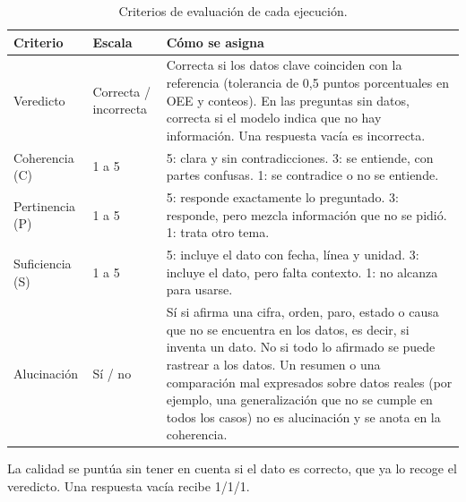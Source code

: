 \begin{singlespace}
\begin{table}[H]
\centering\small\renewcommand{\arraystretch}{1.25}
\caption{Criterios de evaluación de cada ejecución.}\label{tab:criterios_anexo}
\begin{tabular}{@{}p{2.6cm}p{2.4cm}p{9.2cm}@{}}
\toprule
\rowcolor{tblhead}\textbf{Criterio} & \textbf{Escala} & \textbf{Cómo se asigna}\\
\midrule
Veredicto & Correcta / incorrecta & Correcta si los datos clave coinciden con la referencia (tolerancia de 0,5 puntos porcentuales en OEE y conteos). En las preguntas sin datos, correcta si el modelo indica que no hay información. Una respuesta vacía es incorrecta.\\
\rowcolor{tblzebra}Coherencia (C) & 1 a 5 & 5: clara y sin contradicciones. 3: se entiende, con partes confusas. 1: se contradice o no se entiende.\\
Pertinencia (P) & 1 a 5 & 5: responde exactamente lo preguntado. 3: responde, pero mezcla información que no se pidió. 1: trata otro tema.\\
\rowcolor{tblzebra}Suficiencia (S) & 1 a 5 & 5: incluye el dato con fecha, línea y unidad. 3: incluye el dato, pero falta contexto. 1: no alcanza para usarse.\\
Alucinación & Sí / no & Sí si afirma una cifra, orden, paro, estado o causa que no se encuentra en los datos, es decir, si inventa un dato. No si todo lo afirmado se puede rastrear a los datos. Un resumen o una comparación mal expresados sobre datos reales (por ejemplo, una generalización que no se cumple en todos los casos) no es alucinación y se anota en la coherencia.\\
\bottomrule
\end{tabular}
\end{table}
La calidad se puntúa sin tener en cuenta si el dato es correcto, que ya lo recoge el veredicto. Una respuesta vacía recibe 1/1/1.

\end{singlespace}
